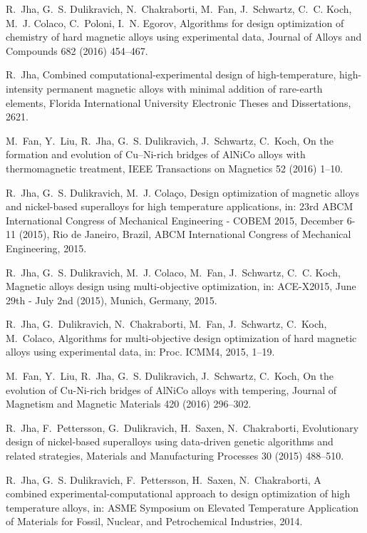 \begin{thebibliography}{10}
R.~Jha, G.~S. Dulikravich, N.~Chakraborti, M.~Fan, J.~Schwartz, C.~C. Koch,
  M.~J. Colaco, C.~Poloni, I.~N. Egorov, Algorithms for design optimization of
  chemistry of hard magnetic alloys using experimental data, Journal of Alloys
  and Compounds 682 (2016) 454--467.

R.~Jha, Combined computational-experimental design of high-temperature,
  high-intensity permanent magnetic alloys with minimal addition of rare-earth
  elements, Florida International University  Electronic Theses and Dissertations, 2621.

M.~Fan, Y.~Liu, R.~Jha, G.~S. Dulikravich, J.~Schwartz, C.~Koch, On the
  formation and evolution of Cu--Ni-rich bridges of AlNiCo alloys with
  thermomagnetic treatment, IEEE Transactions on Magnetics 52 (2016) 1--10.


R.~Jha, G.~S. Dulikravich, M.~J. Cola{\c{c}}o, Design optimization of magnetic
  alloys and nickel-based superalloys for high temperature applications, in:
  23rd ABCM International Congress of Mechanical Engineering - COBEM 2015,
  December 6-11 (2015), Rio de Janeiro, Brazil, ABCM International Congress of
  Mechanical Engineering, 2015.

R.~Jha, G.~S. Dulikravich, M.~J. Colaco, M.~Fan, J.~Schwartz, C.~C. Koch,
  Magnetic alloys design using multi-objective optimization, in: ACE-X2015,
  June 29th - July 2nd (2015), Munich, Germany, 2015.

R.~Jha, G.~Dulikravich, N.~Chakraborti, M.~Fan, J.~Schwartz, C.~Koch,
  M.~Colaco, Algorithms for multi-objective design optimization of hard
  magnetic alloys using experimental data, in: Proc. ICMM4, 2015, 1--19.

M.~Fan, Y.~Liu, R.~Jha, G.~S. Dulikravich, J.~Schwartz, C.~Koch, On the
  evolution of Cu-Ni-rich bridges of AlNiCo alloys with tempering, Journal of
  Magnetism and Magnetic Materials 420 (2016) 296--302.

R.~Jha, F.~Pettersson, G.~Dulikravich, H.~Saxen, N.~Chakraborti, Evolutionary
  design of nickel-based superalloys using data-driven genetic algorithms and
  related strategies, Materials and Manufacturing Processes 30 (2015) 488--510.

R.~Jha, G.~S. Dulikravich, F.~Pettersson, H.~Saxen, N.~Chakraborti, A combined
  experimental-computational approach to design optimization of high
  temperature alloys, in: ASME Symposium on Elevated Temperature Application of
  Materials for Fossil, Nuclear, and Petrochemical Industries, 2014.


\end{thebibliography}
